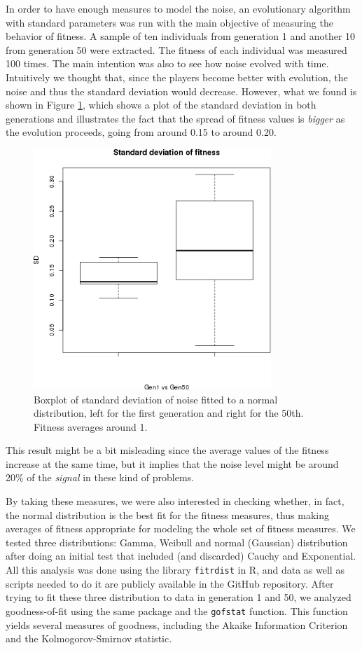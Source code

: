 \documentclass{svmult}
\begin{document}
In order to have enough measures to model the noise, an evolutionary algorithm with standard parameters was run with the
main objective of measuring the behavior of fitness. A sample of ten
individuals from generation 1 and another 10 from generation 50 were
extracted. The fitness of each individual was measured 100 times. 
The main intention was also to see how noise evolved with
time. Intuitively we thought that, since the players become better
with evolution, the noise and thus the standard deviation would
decrease. However, what we found is shown in Figure \ref{fig:sd},
which shows a plot of the standard deviation in both generations and
illustrates the fact that the spread of fitness values is {\em bigger}
as the evolution proceeds, going from around 0.15 to around 0.20. 
%
\begin{figure}[ht!b]
\centering
\includegraphics[width=0.8\textwidth]{../images/sd.png}
\caption{Boxplot of standard deviation of noise fitted to a normal
  distribution, left for the first generation and right for the
  50th. Fitness averages around 1. \label{fig:sd}}
\end{figure}
%
This result might be a bit misleading since the average values of
the fitness increase at the same time, but it implies that the noise
level might be around 20\% of the {\em signal} in these kind of problems. 

By taking these measures, we were also interested in checking whether, in fact, the normal
distribution is the best fit for the fitness measures, thus making
averages of fitness appropriate for modeling the whole set of fitness
measures. We tested three
distributions: Gamma, Weibull and normal (Gaussian) distribution after
doing an initial test that included (and discarded) Cauchy and Exponential. All this
analysis was done using the library {\tt fitrdist} in R, and data as
well as scripts needed to do it are publicly available in the GitHub repository. After trying
to fit these three distribution to data in generation 1 and 50, we
analyzed goodness-of-fit using the same package and the {\tt gofstat}
function. This function yields several measures of goodness, including
the Akaike Information Criterion and the Kolmogorov-Smirnov statistic.
\end{document}
